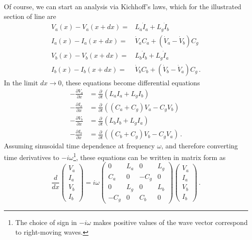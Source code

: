 Of course, we can start an analysis via Kichhoff's laws, which for the illustrated section of line are
\begin{align*}
  V_a(x) - V_a(x + dx) =& L_a \dot I_a + L_g \dot I_b \\
  I_a(x) - I_a(x + dx) =& \dot V_a C_a + \left( \dot V_a - \dot V_b \right) C_g \\
  V_b(x) - V_b(x + dx) =& L_b \dot I_b + L_g \dot I_a \\
  I_b(x) - I_b(x + dx) =& \dot V_b C_b + \left( \dot V_b - \dot V_a \right) C_g
  \, .
\end{align*}
In the limit $dx \rightarrow 0$, these equations become differential equations
\begin{align}
  - \frac{\partial V_a}{\partial x} &= \frac{\partial}{\partial t}
    \left( L_a I_a + L_g I_b \right) \nonumber \\
  - \frac{\partial I_a}{\partial x} &= \frac{\partial}{\partial t}
    \left( (C_a + C_g)V_a - C_g V_b \right) \nonumber \\
  - \frac{\partial V_b}{\partial x} &= \frac{\partial}{\partial t}
    \left( L_b I_b + L_g I_a \right) \nonumber \\
  - \frac{\partial I_b}{\partial x} &= \frac{\partial}{\partial t}
    \left( (C_b + C_g)V_b - C_g V_a \right)
  \, .
\end{align}
Assuming sinusoidal time dependence at frequency $\omega$, and therefore converting time derivatives to $-i \omega$\footnote{The choice of sign in $-i \omega$ makes positive values of the wave vector correspond to right-moving waves.}, these equations can be written in matrix form as
\begin{equation}
  \frac{d}{dx} \left(
    \begin{array}{c} V_a \\ I_a \\ V_b \\ I_b \end{array}
  \right)
  =
  i \omega \left( \begin{array}{cccc}
    0 & L_a & 0 & L_g \\
    C_a & 0 & -C_g & 0 \\
    0 & L_g & 0 & L_b \\
    -C_g & 0 & C_b & 0
  \end{array} \right)
  \left(
    \begin{array}{c} V_a \\ I_a \\ V_b \\ I_b \end{array}
  \right) \, .
\end{equation}
